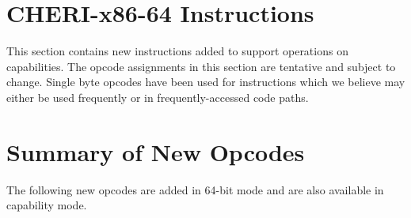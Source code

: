 \clearpage
\section{CHERI-x86-64 Instructions}

This section contains new instructions added to support operations on
capabilities.  The opcode assignments in this section are tentative
and subject to change.  Single byte opcodes have been used for
instructions which we believe may either be used frequently or in
frequently-accessed code paths.































\clearpage
\section{Summary of New Opcodes}

The following new opcodes are added in 64-bit mode and are also
available in capability mode.

